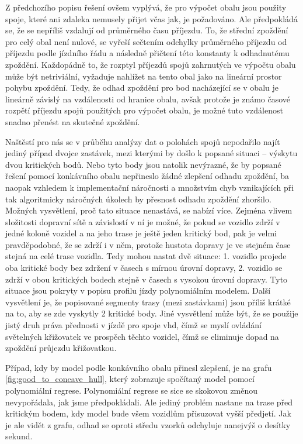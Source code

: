 \bigbreak


Z předchozího popisu řešení ovšem vyplývá, že pro výpočet obalu jsou použity spoje, které ani zdaleka nemusely přijet včas jak, je požadováno. Ale předpokládá se, že se nepříliš vzdalují od průměrného času příjezdu. To, že střední zpoždění pro celý obal není nulové, se vyřeší sečtením odchylky průměrného příjezdu od příjezdu podle jízdního řádu a následně přičtení této konstanty k odhadnutému zpoždění. Každopádně to, že rozptyl příjezdů spojů zahrnutých ve výpočtu obalu může být netriviální, vyžaduje nahlížet na tento obal jako na lineární prostor pohybu zpoždění. Tedy, že odhad zpoždění pro bod nacházející se v obalu je lineárně závislý na vzdálenosti od hranice obalu, avšak protože je známo časové rozpětí příjezdu spojů použitých pro výpočet obalu, je možné tuto vzdálenost snadno přenést na skutečné zpoždění.


\bigbreak


Naštěstí pro nás se v průběhu analýzy dat o polohách spojů nepodařilo najít jediný případ dvojce zastávek, mezi kterými by došlo k popsané situaci -- výskytu dvou kritických bodů. Nebo tyto body jsou natolik nevýrazné, že by popsané řešení pomocí konkávního obalu nepřineslo žádné zlepšení odhadu zpoždění, ba naopak vzhledem k implementační náročnosti a množstvím chyb vznikajících při tak algoritmicky náročných úkolech by přesnost odhadu zpoždění zhoršilo. Možných vysvětlení, proč tato situace nenastává, se nabízí více. Zejména vlivem složitosti dopravní sítě a závislostí v ní je možné, že pokud se vozidlo zdrží v jedné koloně vozidel a na jeho trase je ještě jeden kritický bod, pak je velmi pravděpodobné, že se zdrží i v něm, protože hustota dopravy je ve stejném čase stejná na celé trase vozidla. Tedy mohou nastat dvě situace: 1. vozidlo projede oba kritické body bez zdržení v časech s mírnou úrovní dopravy, 2. vozidlo se zdrží v obou kritických bodech stejně v časech s vysokou úrovní dopravy. Tyto situace jsou pokryty v popisu profilu jízdy polynomiálním modelem. Další vysvětlení je, že popisované segmenty trasy (mezi zastávkami) jsou příliš krátké na to, aby se zde vyskytly 2 kritické body. Jiné vysvětlení může být, že se použije jistý druh práva přednosti v jízdě pro spoje \gls{vhd}, čímž se myslí ovládání světelných křižovatek ve prospěch těchto vozidel, čímž se eliminuje dopad na zpoždění průjezdu křižovatkou.


\bigbreak


Případ, kdy by model podle konkávního obalu přinesl zlepšení, je na grafu \ref{fig:good_to_concave_hull}, který zobrazuje spočítaný model pomocí polynomiální regrese. Polynomiální regrese se sice se skokovou změnou nevypořádala, jak jsme předpokládali. Ale jediný problém nastane na trase před kritickým bodem, kdy model bude všem vozidlům přisuzovat vyšší předjetí. Jak je ale vidět z grafu, odhad se oproti středu vzorků odchyluje nanejvýš o desítky sekund.



